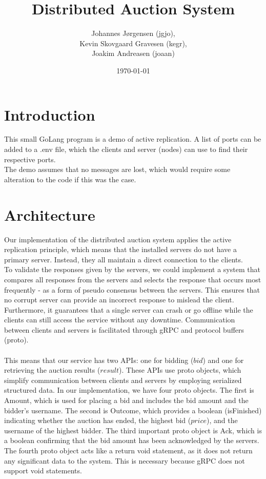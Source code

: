 \documentclass[a4paper,11pt]{article}
\title{Distributed Auction System}
\author{Johannes Jørgensen (jgjo),\\ Kevin Skovgaard Gravesen (kegr),\\ Joakim Andreasen (joaan)}
\date{\today}
\begin{document}
 

\maketitle

\section{Introduction}
This small GoLang program is a demo of active replication. A list of ports can be added to a .env file,
which the clients and server (nodes) can use to find their respective ports.
\\
The demo assumes that no messages are lost, which would require some alteration to the code if this was the case.

\section{Architecture}
Our implementation of the distributed auction system applies the active replication principle, which means that the installed servers do not have a primary server. Instead, they all maintain a direct connection to the clients.\\
To validate the responses given by the servers, we could implement a system that compares all responses from the servers and selects the response that occurs most frequently - as a form of pseudo consensus between the servers. This ensures that no corrupt server can provide an incorrect response to mislead the client.
Furthermore, it guarantees that a single server can crash or go offline while the clients can still access the service without any downtime. Communication between clients and servers is facilitated through gRPC and protocol buffers (proto).\\\\
This means that our service has two APIs: one for bidding ($bid$) and one for retrieving the auction results ($result$). These APIs use proto objects, which simplify communication between clients and servers by employing serialized structured data.
In our implementation, we have four proto objects. The first is Amount, which is used for placing a bid and includes the bid amount and the bidder’s username. The second is Outcome, which provides a boolean (isFinished) indicating whether the auction has ended, the highest bid ($price$), and the username of the highest bidder. The third important proto object is Ack, which is a boolean confirming that the bid amount has been acknowledged by the servers.
The fourth proto object acts like a return void statement, as it does not return any significant data to the system. This is necessary because gRPC does not support void statements.
\end{document}
